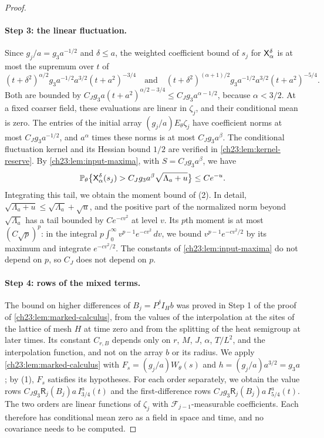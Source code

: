 \begin{proof}
\paragraph{Step 3: the linear fluctuation.}
Since $g_j/a=g_3a^{-1/2}$ and $\delta\le a$, the weighted coefficient bound of $s_j$ for $\mathsf X_{\alpha}^{\delta}$ is at most the supremum over $t$ of
\[
 (t+\delta^2)^{\alpha/2}g_3a^{-1/2}a^{3/2}(t+a^2)^{-3/4}\quad\text{and}\quad
 (t+\delta^2)^{(\alpha+1)/2}g_3a^{-1/2}a^{3/2}(t+a^2)^{-5/4}.
\]
Both are bounded by $C_Jg_3a(t+a^2)^{\alpha/2-3/4}\le C_Jg_3a^{\alpha-1/2}$, because $\alpha<3/2$. At a fixed coarser field, these evaluations are linear in $\zeta_j$, and their conditional mean is zero. The entries of the initial array $(g_j/a)E_\theta\zeta_j$ have coefficient norms at most $C_Jg_3a^{-1/2}$, and $a^\alpha$ times these norms is at most $C_Jg_3a^\beta$. The conditional fluctuation kernel and its Hessian bound $1/2$ are verified in \cref{ch23:lem:kernel-reserve}. By \cref{ch23:lem:input-maxima}, with $S=C_Jg_3a^\beta$, we have
\[
 \mathbb P_\theta\bigl\{\mathsf X_{\alpha}^{\delta}(s_j)>C_Jg_3a^\beta\sqrt{\Lambda_a+u}\bigr\}\le Ce^{-u}.
\]
Integrating this tail, we obtain the moment bound of (2). In detail, $\sqrt{\Lambda_a+u}\le\sqrt{\Lambda_a}+\sqrt u$, and the positive part of the normalized norm beyond $\sqrt{\Lambda_a}$ has a tail bounded by $Ce^{-cv^2}$ at level $v$. Its $p$th moment is at most $(C\sqrt p)^p$: in the integral $p\int_0^\infty v^{p-1}e^{-cv^2}\,dv$, we bound $v^{p-1}e^{-cv^2/2}$ by its maximum and integrate $e^{-cv^2/2}$. The constants of \cref{ch23:lem:input-maxima} do not depend on $p$, so $C_J$ does not depend on $p$.

\paragraph{Step 4: rows of the mixed terms.}
The bound on higher differences of $B_j=P_\cdot^\delta I_Hb$ was proved in Step 1 of the proof of \cref{ch23:lem:marked-calculus}, from the values of the interpolation at the sites of the lattice of mesh $H$ at time zero and from the splitting of the heat semigroup at later times. Its constant $C_{r,B}$ depends only on $r$, $M$, $J$, $\alpha$, $T/L^2$, and the interpolation function, and not on the array $b$ or its radius. We apply \cref{ch23:lem:marked-calculus} with $F_s=(g_j/a)W_\theta(s)$ and $h=(g_j/a)a^{3/2}=g_3a$; by (1), $F_s$ satisfies its hypotheses. For each order separately, we obtain the value rows $C_Jg_3\mathsf R_j(B_j)a\,I_{3/4}^a(t)$ and the first-difference rows $C_Jg_3\mathsf R_j(B_j)a\,I_{5/4}^a(t)$. The two orders are linear functions of $\zeta_j$ with $\mathcal F_{j-1}$-measurable coefficients. Each therefore has conditional mean zero as a field in space and time, and no covariance needs to be computed.


\end{proof}
